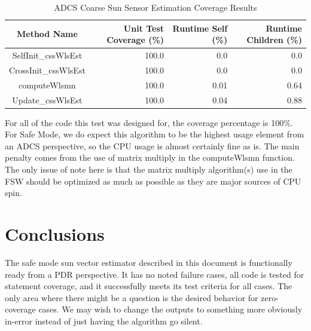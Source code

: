 \documentclass[]{LASPreport}
\begin{document}
\begin{table}[htbp]
    \caption{ADCS Coarse Sun Sensor Estimation Coverage Results}
   \label{tab:cov_met}
        \centering \fontsize{10}{10}\selectfont
   \begin{tabular}{c | r | r | r} %
      \hline
      Method Name    & Unit Test Coverage (\%) & Runtime Self (\%) & Runtime Children (\%) \\
      \hline
      SelfInit\_cssWlsEst& 100.0 & 0.0 & 0.0 \\
      CrossInit\_cssWlsEst & 100.0 & 0.0 & 0.0 \\
      computeWlsmn & 100.0 & 0.01 & 0.64 \\
      Update\_cssWlsEst & 100.0 & 0.04 & 0.88 \\
      \hline
   \end{tabular}
\end{table}

For all of the code this test was designed for, the coverage percentage is 
100\%.  For Safe Mode, we do expect this algorithm to be the highest usage 
element from an ADCS perspective, so the CPU usage is almost certainly fine as 
is.  The main penalty comes from the use of matrix multiply in the computeWlsmn 
function.  The only issue of note here is that the matrix multiply algorithm(s) 
use in the FSW should be optimized as much as possible as they are major sources 
of CPU spin.

\section{Conclusions}
The safe mode sun vector estimator described in this document is functionally 
ready from a PDR perspective.  It has no noted failure cases, all code is tested 
for statement coverage, and it successfully meets its test criteria for all 
cases.  The only area where there might be a question is the desired behavior 
for zero-coverage cases.  We may wish to change the outputs to something more 
obviously in-error instead of just having the algorithm go silent.
\end{document}
